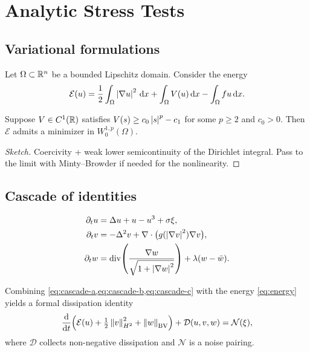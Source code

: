 \chapter{Analytic Stress Tests}
\label{ch:analysis}

\section{Variational formulations}
Let $\Omega\subset\mathbb{R}^{n}$ be a bounded Lipschitz domain. Consider the energy
\begin{equation}
\label{eq:energy}
\mathcal{E}(u)
=
\frac12\int_{\Omega}\left\lvert\nabla u\right\rvert^{2}\,\mathrm{d}x
+
\int_{\Omega}V(u)\,\mathrm{d}x
-
\int_{\Omega}fu\,\mathrm{d}x.
\end{equation}

\begin{theorem}
Suppose $V\in C^{1}(\mathbb{R})$ satisfies $V(s)\ge c_{0}\left\lvert s\right\rvert^{p}-c_{1}$ for some
$p\ge 2$ and $c_{0}>0$. Then $\mathcal{E}$ admits a minimizer in
$W^{1,p}_{0}(\Omega)$.
\end{theorem}

\begin{proof}[Sketch]
Coercivity + weak lower semicontinuity of the Dirichlet integral. Pass to the
limit with Minty--Browder if needed for the nonlinearity.
\end{proof}

\section{Cascade of identities}
\begin{align}
\label{eq:cascade-a}
\partial_{t}u
&=
\Delta u + u - u^{3} + \sigma\xi,
\\
\label{eq:cascade-b}
\partial_{t}v
&=
-\Delta^{2}v + \nabla\cdot\bigl(g(\left\lvert\nabla v\right\rvert^{2})\nabla v\bigr),
\\
\label{eq:cascade-c}
\partial_{t}w
&=
\operatorname{div}\!\left(
\frac{\nabla w}{\sqrt{1+\left\lvert\nabla w\right\rvert^{2}}}
\right)
+
\lambda(w-\bar w).
\end{align}

Combining \cref{eq:cascade-a,eq:cascade-b,eq:cascade-c} with the energy
\eqref{eq:energy} yields a formal dissipation identity
\begin{equation}
\frac{\mathrm{d}}{\mathrm{d}t}
\Bigl(
\mathcal{E}(u)+\tfrac12\left\lVert v\right\rVert_{H^{2}}^{2}+\left\lVert w\right\rVert_{\mathrm{BV}}
\Bigr)
+
\mathcal{D}(u,v,w)
=
\mathcal{N}(\xi),
\end{equation}
where $\mathcal{D}$ collects non-negative dissipation and $\mathcal{N}$ is a
noise pairing.

